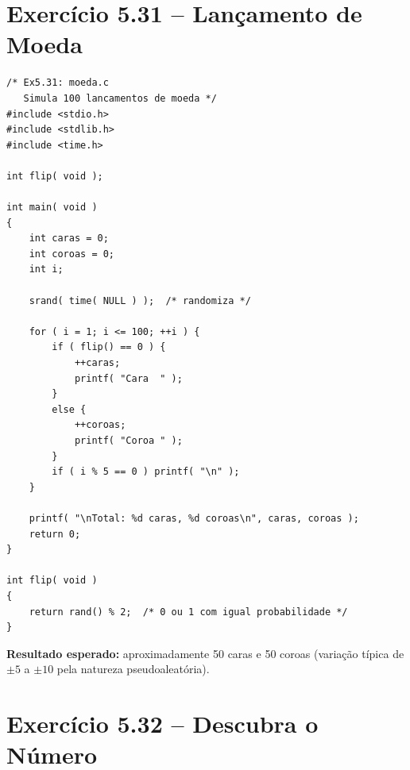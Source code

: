 \documentclass[12pt,a4paper]{article}
\begin{document}
\section{Exercício 5.31 -- Lançamento de Moeda}

\begin{respostabox}
\begin{lstlisting}
/* Ex5.31: moeda.c
   Simula 100 lancamentos de moeda */
#include <stdio.h>
#include <stdlib.h>
#include <time.h>

int flip( void );

int main( void )
{
    int caras = 0;
    int coroas = 0;
    int i;

    srand( time( NULL ) );  /* randomiza */

    for ( i = 1; i <= 100; ++i ) {
        if ( flip() == 0 ) {
            ++caras;
            printf( "Cara  " );
        }
        else {
            ++coroas;
            printf( "Coroa " );
        }
        if ( i % 5 == 0 ) printf( "\n" );
    }

    printf( "\nTotal: %d caras, %d coroas\n", caras, coroas );
    return 0;
}

int flip( void )
{
    return rand() % 2;  /* 0 ou 1 com igual probabilidade */
}
\end{lstlisting}

\textbf{Resultado esperado:} aproximadamente 50 caras e 50 coroas (variação típica
de $\pm 5$ a $\pm 10$ pela natureza pseudoaleatória).
\end{respostabox}

\section{Exercício 5.32 -- Descubra o Número}
\end{document}
